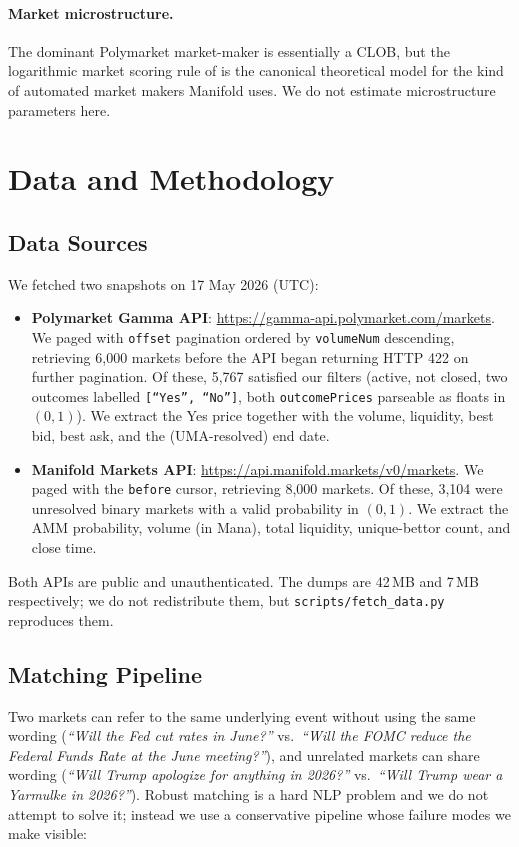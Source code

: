 \documentclass{article}
\begin{document}
\paragraph{Market microstructure.} The dominant Polymarket market-maker is essentially a CLOB, but the logarithmic market scoring rule of \citet{hanson2007lmsr} is the canonical theoretical model for the kind of automated market makers Manifold uses. We do not estimate microstructure parameters here.

\section{Data and Methodology}

\subsection{Data Sources}

We fetched two snapshots on 17 May 2026 (UTC):
\begin{itemize}
  \item \textbf{Polymarket Gamma API}: \url{https://gamma-api.polymarket.com/markets}. We paged with \texttt{offset} pagination ordered by \texttt{volumeNum} descending, retrieving 6{,}000 markets before the API began returning HTTP 422 on further pagination. Of these, 5{,}767 satisfied our filters (active, not closed, two outcomes labelled \texttt{[``Yes'', ``No'']}, both \texttt{outcomePrices} parseable as floats in $(0,1)$). We extract the Yes price together with the volume, liquidity, best bid, best ask, and the (UMA-resolved) end date.
  \item \textbf{Manifold Markets API}: \url{https://api.manifold.markets/v0/markets}. We paged with the \texttt{before} cursor, retrieving 8{,}000 markets. Of these, 3{,}104 were unresolved binary markets with a valid probability in $(0,1)$. We extract the AMM probability, volume (in Mana), total liquidity, unique-bettor count, and close time.
\end{itemize}

Both APIs are public and unauthenticated. The dumps are 42\,MB and 7\,MB respectively; we do not redistribute them, but \texttt{scripts/fetch\_data.py} reproduces them.

\subsection{Matching Pipeline}

Two markets can refer to the same underlying event without using the same wording (\emph{``Will the Fed cut rates in June?''} vs.\ \emph{``Will the FOMC reduce the Federal Funds Rate at the June meeting?''}), and unrelated markets can share wording (\emph{``Will Trump apologize for anything in 2026?''} vs.\ \emph{``Will Trump wear a Yarmulke in 2026?''}). Robust matching is a hard NLP problem and we do not attempt to solve it; instead we use a conservative pipeline whose failure modes we make visible:
\end{document}
